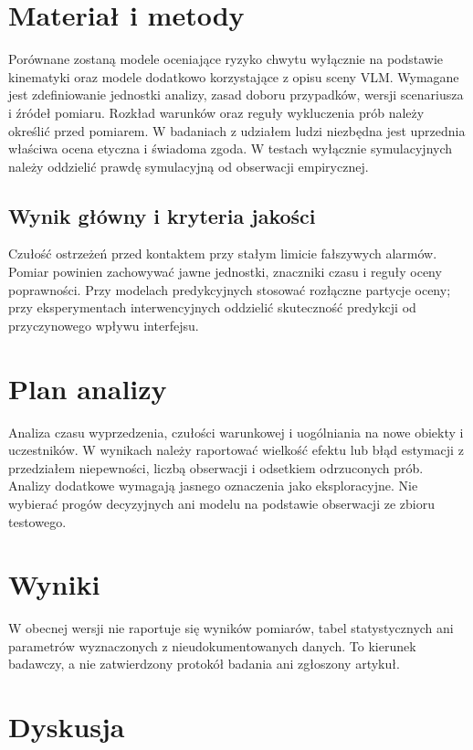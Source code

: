 \documentclass[11pt,a4paper]{article}
\begin{document}
\section{Materiał i metody}

Porównane zostaną modele oceniające ryzyko chwytu wyłącznie na podstawie kinematyki oraz modele dodatkowo korzystające z opisu sceny VLM. Wymagane jest zdefiniowanie jednostki analizy, zasad doboru przypadków, wersji scenariusza i źródeł pomiaru. Rozkład warunków oraz reguły wykluczenia prób należy określić przed pomiarem. W badaniach z udziałem ludzi niezbędna jest uprzednia właściwa ocena etyczna i świadoma zgoda. W testach wyłącznie symulacyjnych należy oddzielić prawdę symulacyjną od obserwacji empirycznej.

\subsection{Wynik główny i kryteria jakości}

Czułość ostrzeżeń przed kontaktem przy stałym limicie fałszywych alarmów. Pomiar powinien zachowywać jawne jednostki, znaczniki czasu i reguły oceny poprawności. Przy modelach predykcyjnych stosować rozłączne partycje oceny; przy eksperymentach interwencyjnych oddzielić skuteczność predykcji od przyczynowego wpływu interfejsu.

\section{Plan analizy}

Analiza czasu wyprzedzenia, czułości warunkowej i uogólniania na nowe obiekty i uczestników. W wynikach należy raportować wielkość efektu lub błąd estymacji z przedziałem niepewności, liczbą obserwacji i odsetkiem odrzuconych prób. Analizy dodatkowe wymagają jasnego oznaczenia jako eksploracyjne. Nie wybierać progów decyzyjnych ani modelu na podstawie obserwacji ze zbioru testowego.

\section{Wyniki}

W obecnej wersji nie raportuje się wyników pomiarów, tabel statystycznych ani parametrów wyznaczonych z nieudokumentowanych danych. To kierunek badawczy, a nie zatwierdzony protokół badania ani zgłoszony artykuł.

\section{Dyskusja}
\end{document}
